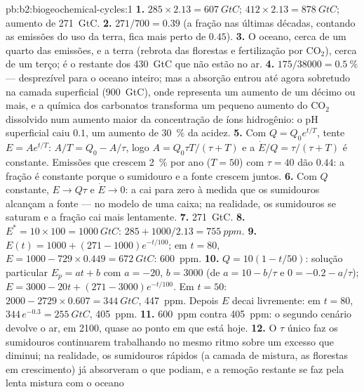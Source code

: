 \begin{solution}{pb:b2:biogeochemical-cycles:1}
\textbf{1.} $285\times 2.13 = \qty{607}{GtC}$; $412\times 2.13 =
\qty{878}{GtC}$; aumento de \qty{271}{GtC}.
\textbf{2.} $271/700 = 0.39$ (a fração nas últimas décadas, contando as
emissões do uso da terra, fica mais perto de $0.45$).
\textbf{3.} O oceano, cerca de um quarto das emissões, e a terra
(rebrota das florestas e fertilização por $\mathrm{CO_2}$), cerca de um terço;
é o restante dos \qty{430}{GtC} que não estão no ar.
\textbf{4.} $175/38000 = \qty{0.5}{\%}$ --- desprezível para o oceano
inteiro; mas a absorção entrou até agora sobretudo na camada superficial
(\qty{900}{GtC}), onde representa um aumento de um décimo ou mais, e a
química dos carbonatos transforma um pequeno aumento do $\mathrm{CO_2}$ dissolvido num
aumento maior da concentração de íons hidrogênio: o pH superficial caiu
$0.1$, um aumento de \qty{30}{\%} da acidez.
\textbf{5.} Com $Q = Q_0 e^{t/T}$, tente $E = Ae^{t/T}$: $A/T = Q_0 -
A/\tau$, logo $A = Q_0\tau T/(\tau + T)$ e a 
$\dot E/Q = \tau/(\tau + T)$ é constante. Emissões que crescem
\qty{2}{\%} por ano ($T = 50$) com $\tau = 40$ dão $0.44$: a fração é
constante porque o sumidouro e a fonte crescem juntos.
\textbf{6.} Com $Q$ constante, $E \to Q\tau$ e $\dot E \to 0$: a  cai para zero à medida que os sumidouros alcançam a fonte ---
no modelo de uma caixa; na realidade, os sumidouros se saturam e a fração
cai mais lentamente.
\textbf{7.} \qty{271}{GtC}.
\textbf{8.} $E^{*} = 10\times 100 = \qty{1000}{GtC}$: $285 +
1000/2.13 = \qty{755}{ppm}$.
\textbf{9.} $E(t) = 1000 + (271 - 1000)e^{-t/100}$; em $t = 80$,
$E = 1000 - 729\times 0.449 = \qty{672}{GtC}$: \qty{600}{ppm}.
\textbf{10.} $Q = 10(1 - t/50)$: solução particular $E_p = at + b$
com $a = -20$, $b = 3000$ (de $a = 10 - b/\tau$ e $0 = -0.2 -
a/\tau$); $E = 3000 - 20t + (271 - 3000)e^{-t/100}$. Em $t = 50$:
$2000 - 2729\times 0.607 = \qty{344}{GtC}$, \qty{447}{ppm}. Depois $E$
decai livremente: em $t = 80$, $344\,e^{-0.3} = \qty{255}{GtC}$,
\qty{405}{ppm}.
\textbf{11.} \qty{600}{ppm} contra \qty{405}{ppm}: o segundo cenário
devolve o ar, em 2100, quase ao ponto em que está hoje.
\textbf{12.} O $\tau$ único faz os sumidouros continuarem trabalhando no
mesmo ritmo sobre um excesso que diminui; na realidade, os sumidouros
rápidos (a camada de mistura, as florestas em crescimento) já absorveram
o que podiam, e a remoção restante se faz pela lenta mistura com o oceano

\end{solution}
